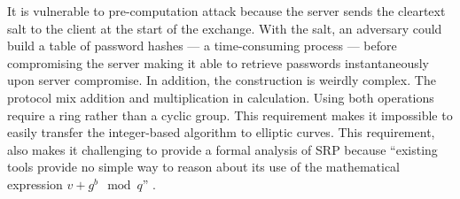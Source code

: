 ﻿\documentclass[../report.tex]{subfiles}
\begin{document}
It is vulnerable to pre-computation attack because the server sends the cleartext salt to the client at the start of the exchange. With the salt, an adversary could build a table of password hashes --- a time-consuming process --- before compromising the server making it able to retrieve passwords instantaneously upon server compromise.
In addition, the construction is weirdly complex.
The protocol mix addition and multiplication in calculation. Using both operations require a ring rather than a cyclic group. This requirement makes it impossible to easily transfer the integer-based algorithm to elliptic curves. %
This requirement, also makes it challenging to provide a formal analysis of SRP because 
``existing tools provide no simple way to reason about its use of the mathematical expression $v+g^b \mod{q}$'' \cite{SRP_Formal_Analysis}. %
\end{document}
